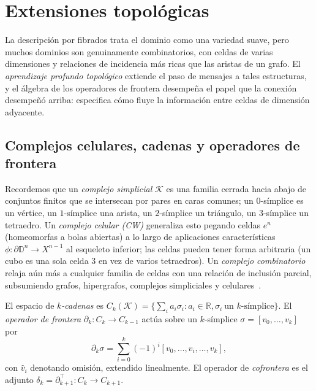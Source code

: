 \section{Extensiones topol\'ogicas}
\label{sec:gauge:topology}

La descripci\'on por fibrados trata el dominio como una variedad suave, pero
muchos dominios son genuinamente combinatorios, con celdas de varias dimensiones
y relaciones de incidencia m\'as ricas que las aristas de un grafo. El
\emph{aprendizaje profundo topol\'ogico} extiende el paso de mensajes a tales
estructuras, y el \'algebra de los operadores de frontera desempe\~na el papel que
la conexi\'on desempe\~n\'o arriba: especifica c\'omo fluye la informaci\'on entre
celdas de dimensi\'on adyacente.

\subsection{Complejos celulares, cadenas y operadores de frontera}
\label{sec:gauge:chains}

Recordemos que un \emph{complejo simplicial} $\mathcal{K}$ es una familia cerrada
hacia abajo de conjuntos finitos que se intersecan por pares en caras comunes; un
$0$-s\'implice es un v\'ertice, un $1$-s\'implice una arista, un $2$-s\'implice un
tri\'angulo, un $3$-s\'implice un tetraedro. Un \emph{complejo celular (CW)}
generaliza esto pegando celdas $e^n$ (homeomorfas a bolas abiertas) a lo largo de
aplicaciones caracter\'isticas $\phi\colon \partial\mathbb{D}^n \to X^{n-1}$ al
esqueleto inferior; las celdas pueden tener forma arbitraria (un cubo es una sola
celda $3$ en vez de varios tetraedros). Un \emph{complejo combinatorio} relaja
a\'un m\'as a cualquier familia de celdas con una relaci\'on de inclusi\'on
parcial, subsumiendo grafos, hipergrafos, complejos simpliciales y
celulares~\citep{hajij2023topological}.

\begin{definition}
\label{def:gauge:chains}
El espacio de \emph{$k$-cadenas} es $C_k(\mathcal{K}) = \{\sum_i a_i\sigma_i : a_i
\in \mathbb{R}, \sigma_i\ \text{un } k\text{-s\'implice}\}$. El \emph{operador de
frontera} $\partial_k\colon C_k \to C_{k-1}$ act\'ua sobre un $k$-s\'implice
$\sigma = [v_0, \ldots, v_k]$ por
\[
  \partial_k \sigma = \sum_{i=0}^k (-1)^i [v_0, \ldots, \hat v_i, \ldots, v_k],
\]
con $\hat v_i$ denotando omisi\'on, extendido linealmente. El operador de
\emph{cofrontera} es el adjunto $\delta_k = \partial_{k+1}^{\!\top}\colon C_k \to
C_{k+1}$.
\end{definition}

